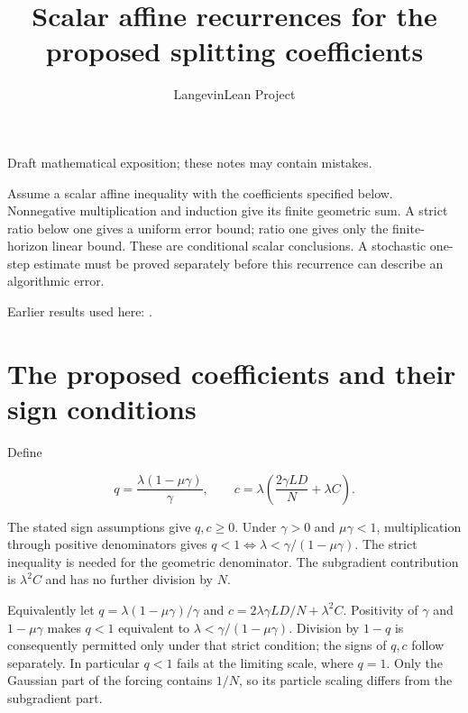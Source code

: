 \documentclass[11pt,a4paper]{article}
\title{\texorpdfstring{Scalar affine recurrences for the proposed splitting coefficients}{Scalar affine recurrences for the proposed splitting coefficients}}
\author{LangevinLean Project}
\date{}
\begin{document}
\maketitle
Draft mathematical exposition; these notes may contain mistakes.


Assume a scalar affine inequality with the coefficients specified below. Nonnegative multiplication and induction give its finite geometric sum. A strict ratio below one gives a uniform error bound; ratio one gives only the finite-horizon linear bound. These are conditional scalar conclusions. A stochastic one-step estimate must be proved separately before this recurrence can describe an algorithmic error.




Earlier results used here: \cite[Section~3.15]{LangevinLean2026ULASC}.

\section{\texorpdfstring{The proposed coefficients and their sign conditions}{The proposed coefficients and their sign conditions}}


Define

\[q=\frac{\lambda(1-\mu\gamma)}\gamma,\qquad c=\lambda\left(\frac{2\gamma LD}{N}+\lambda C\right).\]

The stated sign assumptions give \(q,c\ge0\). Under \(\gamma>0\) and \(\mu\gamma<1\), multiplication through positive denominators gives \(q<1\iff\lambda<\gamma/(1-\mu\gamma)\). The strict inequality is needed for the geometric denominator. The subgradient contribution is \(\lambda^2C\) and has no further division by \(N\).



Equivalently let \(q=\lambda(1-\mu\gamma)/\gamma\) and \(c=2\lambda\gamma LD/N+\lambda^2C\). Positivity of \(\gamma\) and \(1-\mu\gamma\) makes \(q<1\) equivalent to \(\lambda<\gamma/(1-\mu\gamma)\). Division by \(1-q\) is consequently permitted only under that strict condition; the signs of \(q,c\) follow separately. In particular \(q<1\) fails at the limiting scale, where \(q=1\). Only the Gaussian part of the forcing contains \(1/N\), so its particle scaling differs from the subgradient part.
\end{document}
